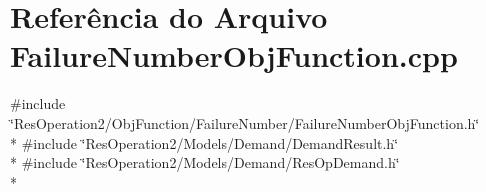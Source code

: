\section{Referência do Arquivo Failure\+Number\+Obj\+Function.\+cpp}
\label{_2_obj_function_2_failure_number_2_failure_number_obj_function_8cpp}
{\ttfamily \#include \char`\"{}Res\+Operation2/\+Obj\+Function/\+Failure\+Number/\+Failure\+Number\+Obj\+Function.\+h\char`\"{}}\\*
{\ttfamily \#include \char`\"{}Res\+Operation2/\+Models/\+Demand/\+Demand\+Result.\+h\char`\"{}}\\*
{\ttfamily \#include \char`\"{}Res\+Operation2/\+Models/\+Demand/\+Res\+Op\+Demand.\+h\char`\"{}}\\*
